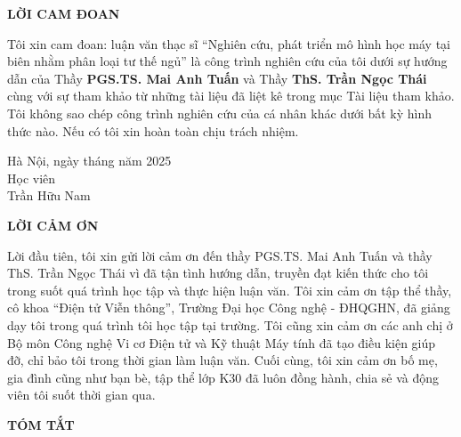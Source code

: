 \changefontsizes[16pt]{14pt}
\begin{center}
	\textbf{LỜI CAM ĐOAN}
\end{center}
Tôi xin cam đoan: luận văn thạc sĩ
“Nghiên cứu, phát triển mô hình học máy tại biên nhằm phân loại tư thế ngủ”
là công trình nghiên cứu của tôi dưới sự hướng dẫn của
Thầy \textbf{PGS.TS. Mai Anh Tuấn} và Thầy \textbf{ThS. Trần Ngọc Thái}
cùng với sự tham khảo từ những tài liệu đã liệt kê trong mục Tài liệu tham khảo. Tôi không sao chép công trình nghiên cứu của cá nhân khác dưới bất kỳ hình thức nào. Nếu có tôi xin hoàn toàn chịu trách nhiệm.

\begin{flushright}
	\begin{varwidth}{\linewidth}\centering
		Hà Nội, ngày \space\space\space\space tháng  \space\space\space\space năm 2025\\
		Học viên\\[2cm]
		Trần Hữu Nam
	\end{varwidth}
\end{flushright}

\newpage

\begin{center}
	\textbf{LỜI CẢM ƠN}
\end{center}

Lời đầu tiên, tôi xin gửi lời cảm ơn đến thầy PGS.TS. Mai Anh Tuấn và thầy ThS.
Trần Ngọc Thái vì đã tận tình hướng dẫn, truyền đạt kiến thức cho tôi trong
suốt quá trình học tập và thực hiện luận văn. Tôi xin cảm ơn tập thể thầy, cô
khoa “Điện tử Viễn thông”, Trường Đại học Công nghệ - ĐHQGHN, đã giảng dạy tôi
trong quá trình tôi học tập tại trường. Tôi cũng xin cảm ơn các anh chị ở Bộ
môn Công nghệ Vi cơ Điện tử và Kỹ thuật Máy tính đã tạo điều kiện giúp đỡ, chỉ
bảo tôi trong thời gian làm luận văn. Cuối cùng, tôi xin cảm ơn bố mẹ, gia đình
cũng như bạn bè, tập thể lớp K30 đã luôn đồng hành, chia sẻ và động viên tôi
suốt thời gian qua.

\newpage
{}
\begin{center}
	\textbf{TÓM TẮT}
\end{center}

